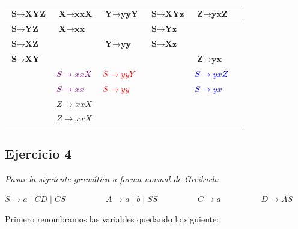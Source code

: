 \begin{table}[H]
	\centering
	\begin{tabular}{|m{1.8cm}|m{1.8cm}|m{1.8cm}|m{1.8cm}|m{1.8cm}|m{1.8cm}|}
		\hline
		$ \textbf{S} \rightarrow \textbf{XYZ} $ & $ \textbf{X} \rightarrow \textbf{xxX} $ & $ \textbf{Y} \rightarrow \textbf{yyY} $ & $ \textbf{S} \rightarrow \textbf{XYz} $ & $ \textbf{Z} \rightarrow \textbf{yxZ} $ \\
		\hline 
		$ \textbf{S} \rightarrow \textbf{YZ} $ & $ \textbf{X} \rightarrow \textbf{xx} $ &  & $ \textbf{S} \rightarrow \textbf{Yz} $ & \\
		\hline
		$ \textbf{S} \rightarrow \textbf{XZ} $ &  & $ \textbf{Y} \rightarrow \textbf{yy} $ & $ \textbf{S} \rightarrow \textbf{Xz} $ & \\
		\hline
		$ \textbf{S} \rightarrow \textbf{XY} $ &  &  &  & $ \textbf{Z} \rightarrow \textbf{yx} $  \\
		\hline \hline
		& \textcolor{purple}{$ S \rightarrow xxX $} & \textcolor{red}{$ S \rightarrow yyY $} &  & \textcolor{blue}{$ S \rightarrow yxZ $}  \\
		\hline
		& \textcolor{purple}{$ S \rightarrow xx $} & \textcolor{red}{$ S \rightarrow yy $} &  & \textcolor{blue}{$ S \rightarrow yx $}  \\
		\hline
		& \textcolor{OliveGreen}{$ Z \rightarrow xxX $} &  &  &  \\
		\hline
		& \textcolor{OliveGreen}{$ Z \rightarrow xxX $} &  &  &  \\
		\hline
	\end{tabular}
	\label{fig:tabla-prac-4D}
\end{table}


\subsection{Ejercicio 4}

\textit{Pasar la siguiente gramática a forma normal de Greibach:} \newline

$ S \rightarrow a \; | \; CD \; | \; CS \hspace{2cm} A \rightarrow a \; | \; b \; | \; SS \hspace{2cm} C \rightarrow  a \hspace{2cm} D \rightarrow  AS $ \newline

Primero renombramos las variables quedando lo siguiente:\newline

